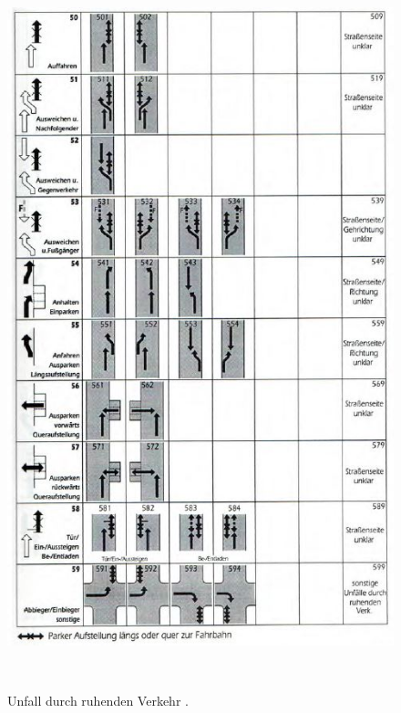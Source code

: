 \begin{savenotes}
	\begin{figure}[H]
		\centering
		\includegraphics[width=13cm,height=21cm]{figures/FT5}
		\caption[Unfall durch ruhenden Verkehr nach GDV]{Unfall durch ruhenden Verkehr \parencite[S. 17]{GesamtverbandderDeutschenVersicherungswirtschafte.V..2016}. }\label{fig:FT5}
	\end{figure}
\end{savenotes}


